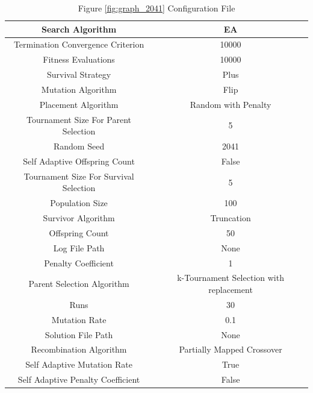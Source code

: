 \documentclass{standalone}
\begin{document}
\clearpage
\begin{table}[!htb]
	\centering
	\caption{Figure \ref{fig:graph_2041} Configuration File}
	\label{tab:graph_2041}
	\begin{tabular}{| c | c |}
		\hline
		Search Algorithm		& EA		 \\
		\hline
		Termination Convergence Criterion		& 10000		 \\
		\hline
		Fitness Evaluations		& 10000		 \\
		\hline
		Survival Strategy		& Plus		 \\
		\hline
		Mutation Algorithm		& Flip		 \\
		\hline
		Placement Algorithm		& Random with Penalty		 \\
		\hline
		Tournament Size For Parent Selection		& 5		 \\
		\hline
		Random Seed		& 2041		 \\
		\hline
		Self Adaptive Offspring Count		& False		 \\
		\hline
		Tournament Size For Survival Selection		& 5		 \\
		\hline
		Population Size		& 100		 \\
		\hline
		Survivor Algorithm		& Truncation		 \\
		\hline
		Offspring Count		& 50		 \\
		\hline
		Log File Path		& None		 \\
		\hline
		Penalty Coefficient		& 1		 \\
		\hline
		Parent Selection Algorithm		& k-Tournament Selection with replacement		 \\
		\hline
		Runs		& 30		 \\
		\hline
		Mutation Rate		& 0.1		 \\
		\hline
		Solution File Path		& None		 \\
		\hline
		Recombination Algorithm		& Partially Mapped Crossover		 \\
		\hline
		Self Adaptive Mutation Rate		& True		 \\
		\hline
		Self Adaptive Penalty Coefficient		& False		 \\
		\hline
	\end{tabular}
\end{table}
\end{document}
